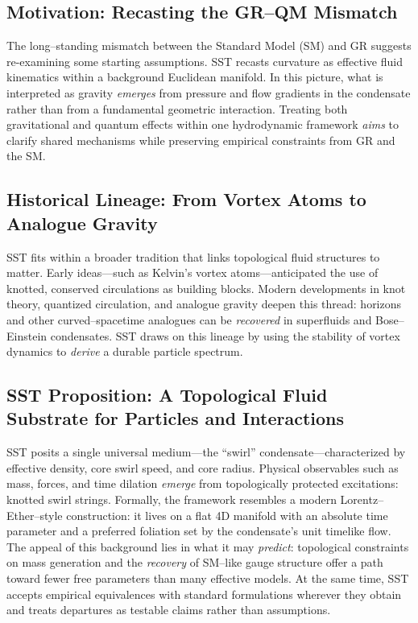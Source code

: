 \documentclass[10pt,reprint,aps,onecolumn,nofootinbib]{revtex4-2}
\begin{document}
        \subsection*{Motivation: Recasting the GR–QM Mismatch}
            The long–standing mismatch between the Standard Model (SM) and GR suggests re-examining some starting assumptions. SST recasts curvature as effective fluid kinematics within a background Euclidean manifold. In this picture, what is interpreted as gravity \emph{emerges} from pressure and flow gradients in the condensate rather than from a fundamental geometric interaction. Treating both gravitational and quantum effects within one hydrodynamic framework \emph{aims} to clarify shared mechanisms while preserving empirical constraints from GR and the SM.

        \subsection*{Historical Lineage: From Vortex Atoms to Analogue Gravity}
            SST fits within a broader tradition that links topological fluid structures to matter. Early ideas—such as Kelvin’s vortex atoms—anticipated the use of knotted, conserved circulations as building blocks. Modern developments in knot theory, quantized circulation, and analogue gravity deepen this thread: horizons and other curved–spacetime analogues can be \emph{recovered} in superfluids and Bose–Einstein condensates. SST draws on this lineage by using the stability of vortex dynamics to \emph{derive} a durable particle spectrum.

        \subsection*{SST Proposition: A Topological Fluid Substrate for Particles and Interactions}
            SST posits a single universal medium—the “swirl” condensate—characterized by effective density, core swirl speed, and core radius. Physical observables such as mass, forces, and time dilation \emph{emerge} from topologically protected excitations: knotted swirl strings. Formally, the framework resembles a modern Lorentz–Ether–style construction: it lives on a flat 4D manifold with an absolute time parameter and a preferred foliation set by the condensate’s unit timelike flow. The appeal of this background lies in what it may \emph{predict}: topological constraints on mass generation and the \emph{recovery} of SM–like gauge structure offer a path toward fewer free parameters than many effective models. At the same time, SST accepts empirical equivalences with standard formulations wherever they obtain and treats departures as testable claims rather than assumptions.
\end{document}

